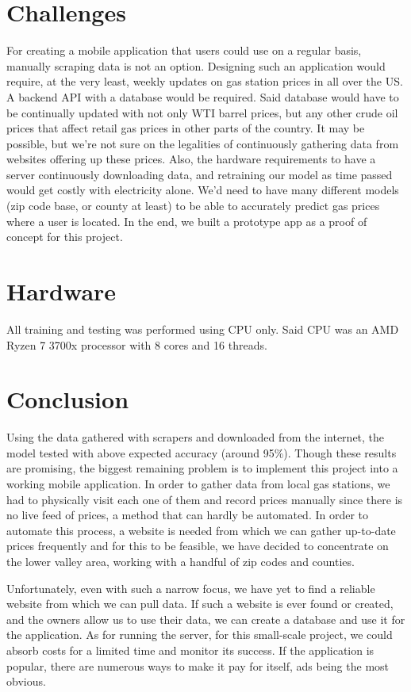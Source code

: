 \documentclass[conference]{IEEEtran}
\begin{document}
\section{Challenges}

For creating a mobile application that users could use on a regular basis, manually scraping data is not an option. Designing such an application would require, at the very least, weekly updates on gas station prices in all over the US. A backend API with a database would be required. Said database would have to be continually updated with not only WTI barrel prices, but any other crude oil prices that affect retail gas prices in other parts of the country. It may be possible, but we’re not sure on the legalities of continuously gathering data from websites offering up these prices. Also, the hardware requirements to have a server continuously downloading data, and retraining our model as time passed would get costly with electricity alone. We’d need to have many different models (zip code base, or county at least) to be able to accurately predict gas prices where a user is located. In the end, we built a prototype app as a proof of concept for this project.

\section{Hardware}

All training and testing was performed using CPU only. Said CPU was an AMD Ryzen 7 3700x processor with 8 cores and 16 threads.

\section{Conclusion}

Using the data gathered with scrapers and downloaded from the internet, the model tested with above expected accuracy (around 95\%). Though these results are promising, the biggest remaining problem is to implement this project into a working mobile application. In order to gather data from local gas stations, we had to physically visit each one of them and record prices manually since there is no live feed of prices, a method that can hardly be automated. In order to automate this process, a website is needed from which we can gather up-to-date prices frequently and for this to be feasible, we have decided to concentrate on the lower valley area, working with a handful of zip codes and counties.  

Unfortunately, even with such a narrow focus, we have yet to find a reliable website from which we can pull data. If such a website is ever found or created, and the owners allow us to use their data, we can create a database and use it for the application. As for running the server, for this small-scale project, we could absorb costs for a limited time and monitor its success. If the application is popular, there are numerous ways to make it pay for itself, ads being the most obvious. 
\end{document}
